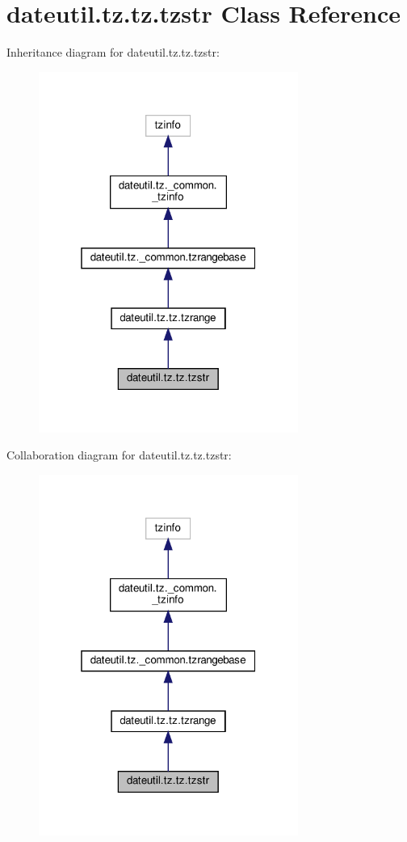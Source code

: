 \hypertarget{classdateutil_1_1tz_1_1tz_1_1tzstr}{}\section{dateutil.\+tz.\+tz.\+tzstr Class Reference}
\label{classdateutil_1_1tz_1_1tz_1_1tzstr}


Inheritance diagram for dateutil.\+tz.\+tz.\+tzstr\+:
\nopagebreak
\begin{figure}[H]
\begin{center}
\leavevmode
\includegraphics[width=241pt]{classdateutil_1_1tz_1_1tz_1_1tzstr__inherit__graph}
\end{center}
\end{figure}


Collaboration diagram for dateutil.\+tz.\+tz.\+tzstr\+:
\nopagebreak
\begin{figure}[H]
\begin{center}
\leavevmode
\includegraphics[width=241pt]{classdateutil_1_1tz_1_1tz_1_1tzstr__coll__graph}
\end{center}
\end{figure}

